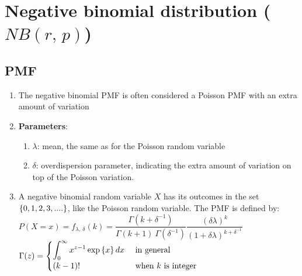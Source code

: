 \section{Negative binomial distribution ($ {\displaystyle  {NB} (r,\,p)}$)}


\subsection{PMF}

\begin{enumerate}
    \item The negative binomial PMF is often considered a Poisson PMF with an extra amount of variation
    \hfill \cite{statistics/book/Statistics-for-Data-Scientists/Maurits-Kaptein}

    \item \textbf{Parameters}:
    \begin{enumerate}
        \item $\lambda$: mean, the same as for the Poisson random variable
        \hfill \cite{statistics/book/Statistics-for-Data-Scientists/Maurits-Kaptein}

        \item $\delta$: overdispersion parameter, indicating the extra amount of variation on top of the Poisson variation.
        \hfill \cite{statistics/book/Statistics-for-Data-Scientists/Maurits-Kaptein}
    \end{enumerate}

    \item A negative binomial random variable $X$ has its outcomes in the set $\left\{0, 1, 2, 3, ....\right\}$, like the Poisson random variable.
    The PMF is defined by:
    \hfill \cite{statistics/book/Statistics-for-Data-Scientists/Maurits-Kaptein}
    \\
    $
        P(X=x)
        = f_{\lambda,\ \delta}(k)
        = \dfrac{\Gamma(k + \delta^{-1})}{\Gamma(k + 1)\ \Gamma(\delta^{-1})}
        \dfrac{(\delta\lambda)^k}{(1+\delta\lambda)^{k+\delta^{-1}}}
    $
    \hfill \cite{statistics/book/Statistics-for-Data-Scientists/Maurits-Kaptein}
    \\
    $
        \Gamma(z) = \begin{cases}
            \displaystyle\int_{0}^{\infty} x^{z-1} \exp\left\{x\right\} dx & \text{ in general} \\
            (k-1)! & \text{ when $k$ is integer}
        \end{cases}
    $
    \hfill \cite{statistics/book/Statistics-for-Data-Scientists/Maurits-Kaptein}


\end{enumerate}
